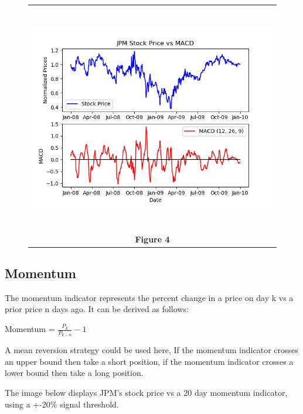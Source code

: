 \documentclass[
	letterpaper, %
]{jdf}
\begin{document}
\begin{figure}[h]
	\begin{tabular}{c}
		\includegraphics[height=10cm]{JPM_macd.png} \\
		\textbf{Figure 4} \\ 
	\end{tabular}
\end{figure}


\subsection{Momentum}

The momentum indicator represents the percent change in a price on day k vs a prior price n days ago.  It can be derived as follows:

Momentum = $ \frac{P_{k}}{P_{k-n}} - 1 $

A mean reversion strategy could be used here, If the momentum indicator crosses an upper bound then take a short position, if the momentum indicator crosses a lower bound then take a long position.

The image below displays JPM's stock price vs a 20 day momentum indicator, using a +-20\% signal threshold.
\end{document}
